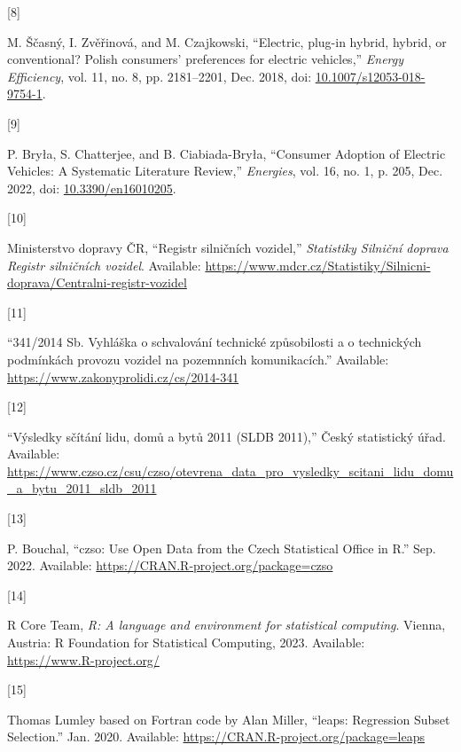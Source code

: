 \documentclass{mmeproc}
\newlength{\cslhangindent}
\newlength{\csllabelwidth}
\newenvironment{CSLReferences}[2] %
 {%
  \setlength{\parindent}{0pt}
  \ifodd #1
  \fi
  \setlength{\parskip}{-2pt}
 }%
 {}
\newcommand{\CSLLeftMargin}[1]{\parbox[t]{\csllabelwidth}{#1}}
\newcommand{\CSLRightInline}[1]{\parbox[t]{\linewidth - \csllabelwidth}{#1}\break}
\begin{document}
\begin{CSLReferences}{0}{0}
\leavevmode{}%
\CSLLeftMargin{{[}8{]} }%
\CSLRightInline{M. Ščasný, I. Zvěřinová, and M. Czajkowski, {``Electric,
plug-in hybrid, hybrid, or conventional? {Polish} consumers' preferences
for electric vehicles,''} \emph{Energy Efficiency}, vol. 11, no. 8, pp.
2181--2201, Dec. 2018, doi:
\href{https://doi.org/10.1007/s12053-018-9754-1}{10.1007/s12053-018-9754-1}.}

\leavevmode{}%
\CSLLeftMargin{{[}9{]} }%
\CSLRightInline{P. Bryła, S. Chatterjee, and B. Ciabiada-Bryła,
{``Consumer {Adoption} of {Electric} {Vehicles}: {A} {Systematic}
{Literature} {Review},''} \emph{Energies}, vol. 16, no. 1, p. 205, Dec.
2022, doi:
\href{https://doi.org/10.3390/en16010205}{10.3390/en16010205}.}

\leavevmode{}%
\CSLLeftMargin{{[}10{]} }%
\CSLRightInline{Ministerstvo dopravy ČR, {``Registr silničních
vozidel,''} \emph{Statistiky {\textbar} Silniční doprava {\textbar}
Registr silničních vozidel}. Available:
\url{https://www.mdcr.cz/Statistiky/Silnicni-doprava/Centralni-registr-vozidel}}

\leavevmode{}%
\CSLLeftMargin{{[}11{]} }%
\CSLRightInline{{``341/2014 {Sb}. {Vyhláška} o schvalování technické
způsobilosti a o technických podmínkách provozu vozidel na pozemnních
komunikacích.''} Available:
\url{https://www.zakonyprolidi.cz/cs/2014-341}}

\leavevmode{}%
\CSLLeftMargin{{[}12{]} }%
\CSLRightInline{{``Výsledky sčítání lidu, domů a bytů 2011 ({SLDB}
2011),''} Český statistický úřad. Available:
\url{https://www.czso.cz/csu/czso/otevrena_data_pro_vysledky_scitani_lidu_domu_a_bytu_2011_sldb_2011}}

\leavevmode{}%
\CSLLeftMargin{{[}13{]} }%
\CSLRightInline{P. Bouchal, {``{czso}: {Use} {Open} {Data} from the
{Czech} {Statistical} {Office} in {R}.''} Sep. 2022. Available:
\url{https://CRAN.R-project.org/package=czso}}

\leavevmode{}%
\CSLLeftMargin{{[}14{]} }%
\CSLRightInline{R Core Team, \emph{R: A language and environment for
statistical computing}. Vienna, Austria: R Foundation for Statistical
Computing, 2023. Available: \url{https://www.R-project.org/}}

\leavevmode{}%
\CSLLeftMargin{{[}15{]} }%
\CSLRightInline{Thomas Lumley based on Fortran code by Alan Miller,
{``{leaps}: {Regression} {Subset} {Selection}.''} Jan. 2020. Available:
\url{https://CRAN.R-project.org/package=leaps}}


\end{CSLReferences}
\end{document}
